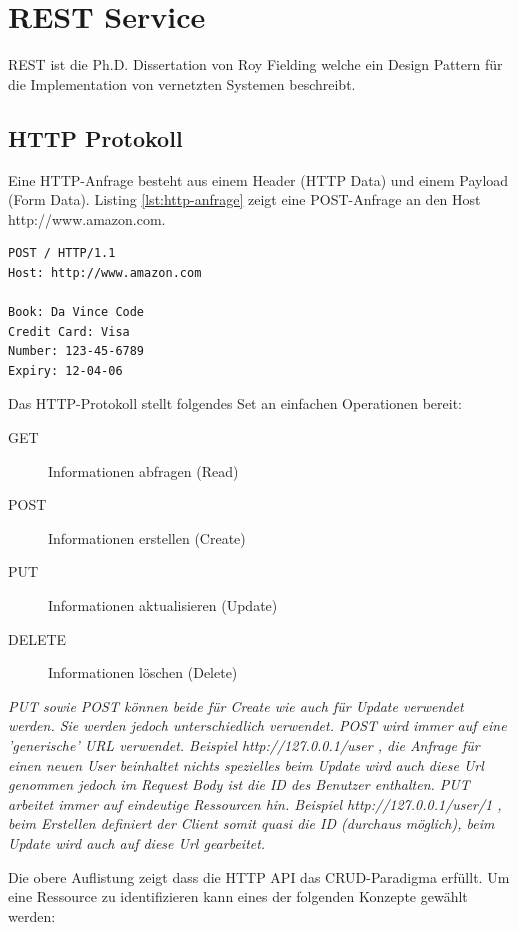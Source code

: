 \chapter{REST Service}
REST ist die Ph.D. Dissertation von Roy Fielding
welche ein Design Pattern für die Implementation von vernetzten Systemen beschreibt.

\section{HTTP Protokoll}

Eine HTTP-Anfrage besteht aus einem Header (HTTP Data) und einem Payload (Form Data). Listing \ref{lst:http-anfrage} zeigt eine POST-Anfrage an den Host http://www.amazon.com. 

\begin{lstlisting}[caption=HTTP-Anfrage, label=lst:http-anfrage]
POST / HTTP/1.1
Host: http://www.amazon.com

Book: Da Vince Code
Credit Card: Visa
Number: 123-45-6789
Expiry: 12-04-06
\end{lstlisting}

Das HTTP-Protokoll stellt folgendes Set an einfachen Operationen bereit:

\begin{description}
	\item[GET] Informationen abfragen (Read)
	\item[POST] Informationen erstellen (Create)
	\item[PUT] Informationen aktualisieren (Update)
	\item[DELETE] Informationen löschen (Delete) 
\end{description}

\emph{PUT sowie POST können beide für Create wie auch für Update verwendet werden. Sie werden jedoch unterschiedlich verwendet. POST wird immer auf eine 'generische' URL verwendet. Beispiel http://127.0.0.1/user , die Anfrage für einen neuen User beinhaltet nichts spezielles beim Update wird auch diese Url genommen jedoch im Request Body ist die ID des Benutzer enthalten. PUT arbeitet immer auf eindeutige Ressourcen hin. Beispiel http://127.0.0.1/user/1 , beim Erstellen definiert der Client somit quasi die ID (durchaus möglich), beim Update wird auch auf diese Url gearbeitet.}

Die obere Auflistung zeigt dass die HTTP API das CRUD-Paradigma erfüllt. Um eine Ressource zu identifizieren kann eines der folgenden Konzepte gewählt werden:

